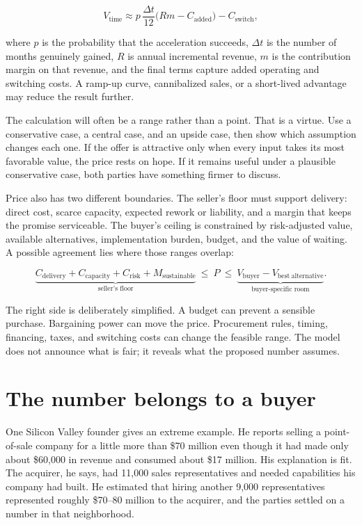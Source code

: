 \begin{equation}
V_{\mathrm{time}}
  \approx p\,\frac{\Delta t}{12}
  \bigl(R m - C_{\mathrm{added}}\bigr)
  - C_{\mathrm{switch}},
\end{equation}

where \(p\) is the probability that the acceleration succeeds, \(\Delta t\) is
the number of months genuinely gained, \(R\) is annual incremental revenue,
\(m\) is the contribution margin on that revenue, and the final terms capture
added operating and switching costs. A ramp-up curve, cannibalized sales, or a
short-lived advantage may reduce the result further.

The calculation will often be a range rather than a point. That is a virtue.
Use a conservative case, a central case, and an upside case, then show which
assumption changes each one. If the offer is attractive only when every input
takes its most favorable value, the price rests on hope. If it remains useful
under a plausible conservative case, both parties have something firmer to
discuss.

Price also has two different boundaries. The seller's floor must support
delivery: direct cost, scarce capacity, expected rework or liability, and a
margin that keeps the promise serviceable. The buyer's ceiling is constrained
by risk-adjusted value, available alternatives, implementation burden, budget,
and the value of waiting. A possible agreement lies where those ranges overlap:

\begin{equation}
\underbrace{C_{\mathrm{delivery}}+C_{\mathrm{capacity}}
  +C_{\mathrm{risk}}+M_{\mathrm{sustainable}}}_{\text{seller's floor}}
\ \leq\ P\ \leq\
\underbrace{V_{\mathrm{buyer}}-V_{\mathrm{best\ alternative}}}_{
  \text{buyer-specific room}}.
\end{equation}

The right side is deliberately simplified. A budget can prevent a sensible
purchase. Bargaining power can move the price. Procurement rules, timing,
financing, taxes, and switching costs can change the feasible range. The model
does not announce what is fair; it reveals what the proposed number assumes.

\section{The number belongs to a buyer}

One Silicon Valley founder gives an extreme example. He reports selling a
point-of-sale company for a little more than \$70 million even though it had
made only about \$60,000 in revenue and consumed about \$17 million. His
explanation is fit. The acquirer, he says, had 11,000 sales representatives and
needed capabilities his company had built. He estimated that hiring another
9,000 representatives represented roughly \$70--80 million to the acquirer,
and the parties settled on a number in that neighborhood.

